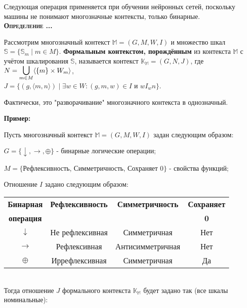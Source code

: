 \documentclass[18pt, a4paper]{extarticle}
\newcounter{par}
\newcounter{spar}
\newcounter{zap}
\newcommand{\opr}{\textbf{\textsc{Определение \thepar.\if\thespar1\thespar.\fi\thezap.\;}}\stepcounter{zap}}
\newcommand{\primer}{\textbf{Пример:\;}}
\newcommand{\bigs}[1]{\scalebox{1.3}{$#1$}}
\begin{document}
Следующая операция применяется при обучении нейронных сетей, поскольку машины не понимают многозначные контексты, только бинарные.\\

\opr

Рассмотрим многозначный контекст $\mathbb{M}=(G,M,W,I)$ и множество шкал $\mathbb{S}=\{\mathbb{S}_m\;|\;m\in M\}$. \textbf{Формальным контекстом, порождённым} из контекста $\mathbb{M}$ с учётом шкалирования $\mathbb{S}$, называется контекст $\mathbb{K}_{\mathbb{M}}=(G,N,J)$, где $N=\underset{m\in M}{\bigs\bigcup}\langle\{m\}\times W_m\rangle$,\\

$J=\{(g,\langle m,n\rangle)\;|\;\exists w\in W:(g,m,w)\in I\text{ и } wI_wn\}$.

Фактически, это "разворачивание"{} многозначного контекста в однозначный.

\primer

Пусть многозначный контекст $\mathbb{M}=(G,M,W,I)$ задан следующим образом:

$G=\{\downarrow,\to,\oplus\}$ - бинарные логические операции;

$M=\{$Рефлексивность, Симметричность, Сохраняет 0$\}$ - свойства функций;

Отношение $I$ задано следующим образом:

\begin{center}
\scalebox{.8}
{
\begin{tabular}{|c|c|c|c|}
\cline{1-4}
\textbf{Бинарная} & \textbf{Рефлексивность} & \textbf{Симметричность} & \textbf{Сохраняет} \\
\textbf{операция} & & & \textbf{0} \\
\cline{1-4}
\textbf{$\downarrow$} & Не рефлексивная & Симметричная & Нет \\
\cline{1-4}
\textbf{$\to$} & Рефлексивная & Антисимметричная & Нет \\
\cline{1-4}
\textbf{$\oplus$} & Иррефлексивная & Симметричная & Да \\
\cline{1-4}
\end{tabular}
}
\end{center}\\

Тогда отношение $J$ формального контекста $\mathbb{K}_{\mathbb{M}}$ будет задано так (все шкалы номинальные):
\end{document}
